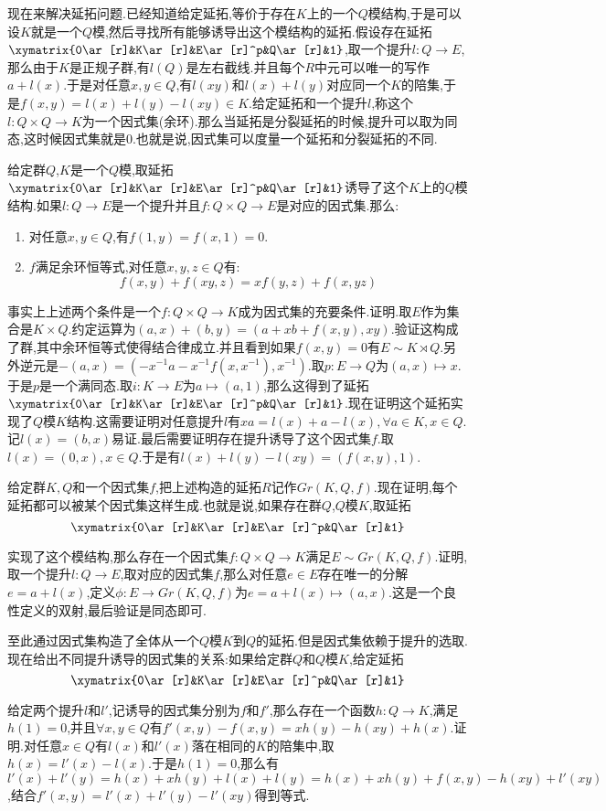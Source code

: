 现在来解决延拓问题.已经知道给定延拓,等价于存在$K$上的一个$Q$模结构,于是可以设$K$就是一个$Q$模,然后寻找所有能够诱导出这个模结构的延拓.假设存在延拓$\xymatrix{0\ar[r]&K\ar[r]&E\ar[r]^p&Q\ar[r]&1}$,取一个提升$l:Q\to E$,那么由于$K$是正规子群,有$l(Q)$是左右截线.并且每个$R$中元可以唯一的写作$a+l(x)$.于是对任意$x,y\in Q$,有$l(xy)$和$l(x)+l(y)$对应同一个$K$的陪集,于是$f(x,y)=l(x)+l(y)-l(xy)\in K$.给定延拓和一个提升$l$,称这个$l:Q\times Q\to K$为一个因式集(余环).那么当延拓是分裂延拓的时候,提升可以取为同态,这时候因式集就是0.也就是说,因式集可以度量一个延拓和分裂延拓的不同.

给定群$Q$,$K$是一个$Q$模,取延拓$\xymatrix{0\ar[r]&K\ar[r]&E\ar[r]^p&Q\ar[r]&1}$诱导了这个$K$上的$Q$模结构.如果$l:Q\to E$是一个提升并且$f:Q\times Q\to E$是对应的因式集.那么:
\begin{enumerate}
	\item 对任意$x,y\in Q$,有$f(1,y)=f(x,1)=0$.
	\item $f$满足余环恒等式,对任意$x,y,z\in Q$有:
	$$f(x,y)+f(xy,z)=xf(y,z)+f(x,yz)$$
\end{enumerate}

事实上上述两个条件是一个$f:Q\times Q\to K$成为因式集的充要条件.证明.取$E$作为集合是$K\times Q$.约定运算为$(a,x)+(b,y)=(a+xb+f(x,y),xy)$.验证这构成了群,其中余环恒等式使得结合律成立.并且看到如果$f(x,y)=0$有$E\sim K\rtimes Q$.另外逆元是$- (a,x)=(-x^{-1}a-x^{-1}f(x,x^{-1}),x^{-1})$.取$p:E\to Q$为$(a,x)\mapsto x$.于是$p$是一个满同态.取$i:K\to E$为$a\mapsto (a,1)$,那么这得到了延拓$\xymatrix{0\ar[r]&K\ar[r]&E\ar[r]^p&Q\ar[r]&1}$.现在证明这个延拓实现了$Q$模$K$结构.这需要证明对任意提升$l$有$xa=l(x)+a-l(x),\forall a\in K,x\in Q$.记$l(x)=(b,x)$易证.最后需要证明存在提升诱导了这个因式集$f$.取$l(x)=(0,x),x\in Q$.于是有$l(x)+l(y)-l(xy)=(f(x,y),1)$.

给定群$K,Q$和一个因式集$f$,把上述构造的延拓$R$记作$Gr(K,Q,f)$.现在证明,每个延拓都可以被某个因式集这样生成.也就是说,如果存在群$Q$,$Q$模$K$,取延拓$$\xymatrix{0\ar[r]&K\ar[r]&E\ar[r]^p&Q\ar[r]&1}$$

实现了这个模结构,那么存在一个因式集$f:Q\times Q\to K$满足$E\sim Gr(K,Q,f)$.证明,取一个提升$l:Q\to E$,取对应的因式集$f$,那么对任意$e\in E$存在唯一的分解$e=a+l(x)$,定义$\phi:E\to Gr(K,Q,f)$为$e=a+l(x)\mapsto(a,x)$.这是一个良性定义的双射,最后验证是同态即可.

至此通过因式集构造了全体从一个$Q$模$K$到$Q$的延拓.但是因式集依赖于提升的选取.现在给出不同提升诱导的因式集的关系:如果给定群$Q$和$Q$模$K$,给定延拓
$$\xymatrix{0\ar[r]&K\ar[r]&E\ar[r]^p&Q\ar[r]&1}$$

给定两个提升$l$和$l'$,记诱导的因式集分别为$f$和$f'$,那么存在一个函数$h:Q\to K$,满足$h(1)=0$,并且$\forall x,y\in Q$有$f'(x,y)-f(x,y)=xh(y)-h(xy)+h(x)$.证明.对任意$x\in Q$有$l(x)$和$l'(x)$落在相同的$K$的陪集中,取$h(x)=l'(x)-l(x)$.于是$h(1)=0$,那么有$l'(x)+l'(y)=h(x)+xh(y)+l(x)+l(y)=h(x)+xh(y)+f(x,y)-h(xy)+l'(xy)$,结合$f'(x,y)=l'(x)+l'(y)-l'(xy)$得到等式.

